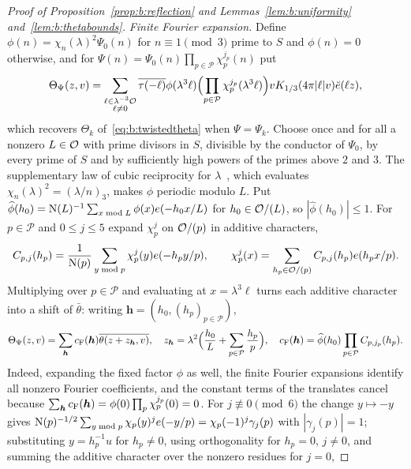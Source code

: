 \begin{proof}[Proof of Proposition~\ref{prop:b:reflection} and Lemmas~\ref{lem:b:uniformity} and~\ref{lem:b:thetabounds}]
\emph{Finite Fourier expansion.} Define $\phi(n)=\chi_n(\lambda)^2\Psi_0(n)$ for $n\equiv1\pmod3$ prime to $S$ and $\phi(n)=0$ otherwise, and for $\Psi(n)=\Psi_0(n)\prod_{p\in\mathcal P}\chi_p^{j_p}(n)$ put
\begin{equation}\label{eq:b:generaltheta}
  \Theta_\Psi(z,v)=\sum_{\substack{\ell\in\lambda^{-3}\mathcal{O}\\\ell\ne0}}\overline{\tau(-\ell)}\phi(\lambda^3\ell)\Bigl(\prod_{p\in\mathcal P}\chi_p^{j_p}(\lambda^3\ell)\Bigr)vK_{1/3}(4\pi|\ell|v)\breve e(\ell z),
\end{equation}
which recovers $\Theta_k$ of~\eqref{eq:b:twistedtheta} when $\Psi=\Psi_k$. Choose once and for all a nonzero $L\in\mathcal{O}$ with prime divisors in $S$, divisible by the conductor of $\Psi_0$, by every prime of $S$ and by sufficiently high powers of the primes above $2$ and $3$. The supplementary law of cubic reciprocity for $\lambda$~\cite[(1.5)]{DR}, which evaluates $\chi_n(\lambda)^2=(\lambda/n)_3$, makes $\phi$ periodic modulo $L$. Put $\widehat\phi(h_0)=\mathrm{N}(L)^{-1}\sum_{x\bmod L}\phi(x)e(-h_0x/L)$ for $h_0\in\mathcal{O}/(L)$, so $|\widehat\phi(h_0)|\le1$. For $p\in\mathcal P$ and $0\le j\le5$ expand $\chi_p^j$ on $\mathcal{O}/(p)$ in additive characters,
\begin{equation}\label{eq:b:localfourier}
  C_{p,j}(h_p)=\frac1{\mathrm{N}(p)}\sum_{y\bmod p}\chi_p^j(y)e(-h_py/p),\qquad\chi_p^j(x)=\sum_{h_p\in\mathcal{O}/(p)}C_{p,j}(h_p)e(h_px/p).
\end{equation}
Multiplying over $p\in\mathcal P$ and evaluating at $x=\lambda^3\ell$ turns each additive character into a shift of $\bar\theta$: writing $\boldsymbol h=(h_0,(h_p)_{p\in\mathcal P})$,
\begin{equation}\label{eq:b:factorizedshifts}
  \Theta_\Psi(z,v)=\sum_{\boldsymbol h}c_{\rm F}(\boldsymbol h)\overline{\theta(z+z_{\boldsymbol h},v)},\quad z_{\boldsymbol h}=\lambda^2\Bigl(\frac{h_0}L+\sum_{p\in\mathcal P}\frac{h_p}p\Bigr),\quad c_{\rm F}(\boldsymbol h)=\widehat\phi(h_0)\prod_{p\in\mathcal P}C_{p,j_p}(h_p).
\end{equation}
Indeed, expanding the fixed factor $\phi$ as well, the finite Fourier expansions identify all nonzero Fourier coefficients, and the constant terms of the translates cancel because $\sum_{\boldsymbol h}c_{\rm F}(\boldsymbol h)=\phi(0)\prod_p\chi_p^{j_p}(0)=0$. For $j\not\equiv0\pmod6$ the change $y\mapsto-y$ gives $\mathrm{N}(p)^{-1/2}\sum_{y\bmod p}\chi_p(y)^je(-y/p)=\chi_p(-1)^j\gamma_j(p)$ with $|\gamma_j(p)|=1$; substituting $y=h_p^{-1}u$ for $h_p\ne0$, using orthogonality for $h_p=0$, $j\ne0$, and summing the additive character over the nonzero residues for $j=0$,

\end{proof}
